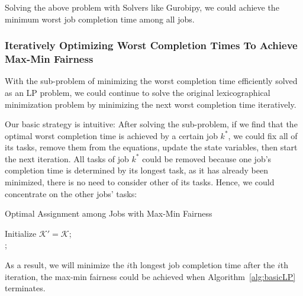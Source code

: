 \documentclass{llncs}
\begin{document}
Solving the above problem with Solvers like Gurobipy, we could achieve the minimum worst job completion time among all jobs.

\subsubsection{Iteratively Optimizing Worst Completion Times To Achieve Max-Min Fairness}
With the sub-problem of minimizing the worst completion time efficiently solved as an LP problem, we could continue to solve the original lexicographical minimization problem by minimizing the next worst completion time iteratively.

Our basic strategy is intuitive: After solving the sub-problem, if we find that the optimal worst completion time is achieved by a certain job $k^*$, we could fix all of its tasks, remove them from the equations, update the state variables,  then start the next iteration. All tasks of job $k^*$ could be removed because one job's completion time is determined by its longest task, as it has already been minimized, there is no need to consider other of its tasks. Hence, we could concentrate on the other jobs' tasks:
\begin{algorithm}
\BlankLine
\caption{Optimal Assignment among Jobs with Max-Min Fairness}
\label{alg:basicLP}
\BlankLine
Initialize $\mathcal{K'}=\mathcal{K}$; \\
;
\end{algorithm}

As a result, we will minimize the $i$th longest job completion time after the $i$th iteration, the max-min fairness could be achieved when Algorithm~\ref{alg:basicLP} terminates.
\end{document}
